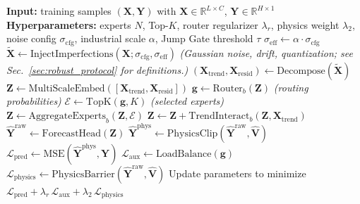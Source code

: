 \documentclass[review,1p,times]{elsarticle}
\begin{document}
\begin{algorithm}[t]
\caption{Ultra-LSNT training workflow with SCADA imperfection injection.}
\label{alg:train}
\begin{algorithmic}[1]
\STATE \textbf{Input:} training samples $(\mathbf{X},\mathbf{Y})$ with $\mathbf{X}\in\mathbb{R}^{L\times C}$, $\mathbf{Y}\in\mathbb{R}^{H\times 1}$
\STATE \textbf{Hyperparameters:} experts $N$, Top-$K$, router regularizer $\lambda_r$, physics weight $\lambda_2$, noise config $\sigma_{\mathrm{cfg}}$, industrial scale $\alpha$, Jump Gate threshold $\tau$
\STATE $\sigma_{\mathrm{eff}} \leftarrow \alpha \cdot \sigma_{\mathrm{cfg}}$
\STATE $\tilde{\mathbf{X}} \leftarrow \mathrm{InjectImperfections}(\mathbf{X}; \sigma_{\mathrm{cfg}},\sigma_{\mathrm{eff}})$
\STATE \hspace{1em}\textit{(Gaussian noise, drift, quantization; see Sec.~\ref{sec:robust_protocol} for definitions.)}
\STATE $(\mathbf{X}_{\mathrm{trend}},\mathbf{X}_{\mathrm{resid}}) \leftarrow \mathrm{Decompose}(\tilde{\mathbf{X}})$
\STATE $\mathbf{Z} \leftarrow \mathrm{MultiScaleEmbed}([\mathbf{X}_{\mathrm{trend}},\mathbf{X}_{\mathrm{resid}}])$
 \STATE $\mathbf{g}\leftarrow \mathrm{Router}_b(\mathbf{Z})$ \hspace{1em}\textit{(routing probabilities)}
 \STATE $\mathcal{E}\leftarrow \mathrm{TopK}(\mathbf{g},K)$ \hspace{1em}\textit{(selected experts)}
 \STATE $\mathbf{Z}\leftarrow \mathrm{AggregateExperts}_b(\mathbf{Z},\mathcal{E})$
 \STATE $\mathbf{Z}\leftarrow \mathbf{Z} + \mathrm{TrendInteract}_b(\mathbf{Z},\mathbf{X}_{\mathrm{trend}})$
\ENDFOR
\STATE $\hat{\mathbf{Y}}^{\mathrm{raw}} \leftarrow \mathrm{ForecastHead}(\mathbf{Z})$
\STATE $\hat{\mathbf{Y}}^{\mathrm{phys}} \leftarrow \mathrm{PhysicsClip}(\hat{\mathbf{Y}}^{\mathrm{raw}},\hat{\mathbf{V}})$
\STATE $\mathcal{L}_{\mathrm{pred}} \leftarrow \mathrm{MSE}(\hat{\mathbf{Y}}^{\mathrm{phys}},\mathbf{Y})$
\STATE $\mathcal{L}_{\mathrm{aux}} \leftarrow \mathrm{LoadBalance}(\mathbf{g})$
\STATE $\mathcal{L}_{\mathrm{physics}} \leftarrow \mathrm{PhysicsBarrier}(\hat{\mathbf{Y}}^{\mathrm{raw}},\hat{\mathbf{V}})$
\STATE Update parameters to minimize $\mathcal{L}_{\mathrm{pred}} + \lambda_r\,\mathcal{L}_{\mathrm{aux}} + \lambda_2\,\mathcal{L}_{\mathrm{physics}}$
\end{algorithmic}
\end{algorithm}
\end{document}
